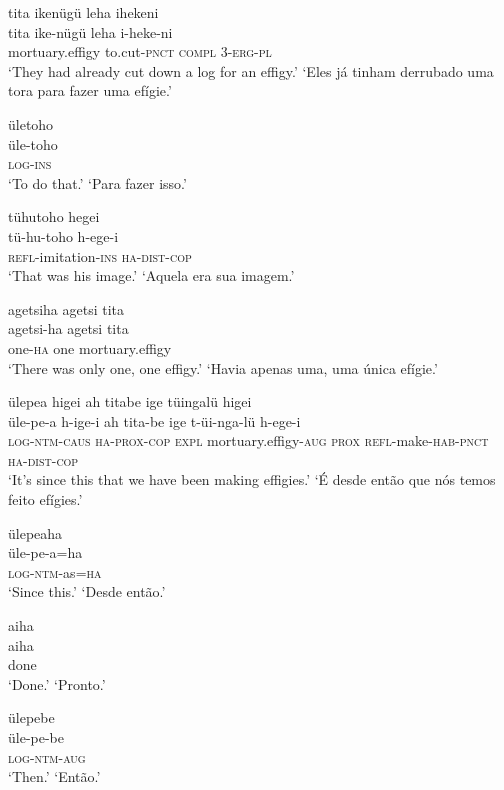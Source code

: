 \documentclass[output=paper,
modfonts,nonflat
]{langsci/langscibook}
\begin{document}
\ea  tita ikenügü leha ihekeni\\[.3em]
\gll tita ike-nügü leha i-heke-ni\\
     mortuary.effigy to.cut-\textsc{pnct} \textsc{compl} 3-\textsc{erg}-\textsc{pl}\\
\glt ‘They had already cut down a log for an effigy.’
\glt ‘Eles já tinham derrubado uma tora para fazer uma efígie.’
\z

\ea  ületoho\\[.3em]
\gll üle-toho\\
     \textsc{log}-\textsc{ins}\\
\glt ‘To do that.’
\glt ‘Para fazer isso.’
\z

\ea  tühutoho hegei\\[.3em]
\gll tü-hu-toho h-ege-i\\
     \textsc{refl}-imitation-\textsc{ins} \textsc{ha}-\textsc{dist}-\textsc{cop}\\
\glt ‘That was his image.’
\glt ‘Aquela era sua imagem.’
\z

\ea  agetsiha agetsi tita\\[.3em]
\gll agetsi-ha agetsi tita\\
     one-\textsc{ha} one mortuary.effigy\\
\glt ‘There was only one, one effigy.’
\glt ‘Havia apenas uma, uma única efígie.’
\z

\ea  ülepea higei ah titabe ige tüingalü higei\\[.3em]
\gll üle-pe-a h-ige-i ah tita-be ige t-üi-nga-lü h-ege-i\\
     \textsc{log}-\textsc{ntm}-\textsc{caus} \textsc{ha}-\textsc{prox}-\textsc{cop} \textsc{expl} mortuary.effigy-\textsc{aug} \textsc{prox} \textsc{refl}-make-\textsc{hab}-\textsc{pnct} \textsc{ha}-\textsc{dist}-\textsc{cop}\\
\glt ‘It's since this that we have been making effigies.’
\glt ‘É desde então que nós temos feito efígies.’
\z

\ea  ülepeaha\\[.3em]
\gll üle-pe-a=ha\\
     \textsc{log}-\textsc{ntm}-as=\textsc{ha}\\
\glt ‘Since this.’
\glt ‘Desde então.’
\z

\ea  aiha\\[.3em]
\gll aiha\\
     done\\
\glt ‘Done.’
\glt ‘Pronto.’
\z

\ea  ülepebe\\[.3em]
\gll üle-pe-be\\
     \textsc{log}-\textsc{ntm}-\textsc{aug}\\
\glt ‘Then.’
\glt ‘Então.’
\z
\end{document}
